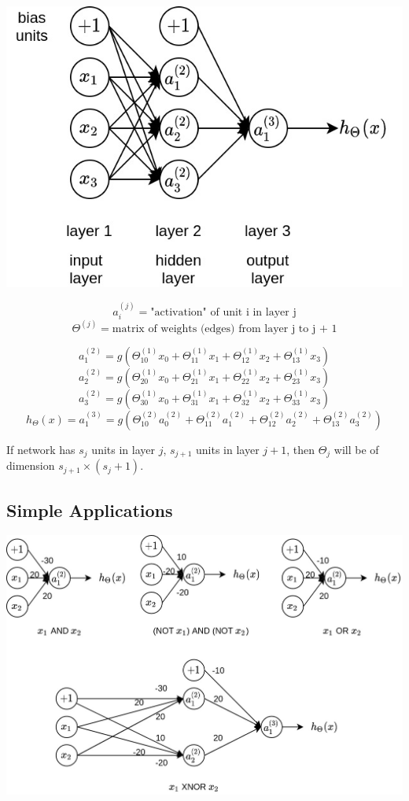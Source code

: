 \documentclass{article}
\begin{document}
\begin{center}
\includegraphics[scale=0.4]{./images/neural_network.jpg}
\end{center}
\[a_i^{(j)} = \text{"activation" of unit i in layer j}\]
\[\Theta^{(j)} = \text{matrix of weights (edges) from layer j to j + 1}\]

\bigskip

\[a_1^{(2)} = g(\Theta_{10}^{(1)} x_0 + \Theta_{11}^{(1)} x_1 + \Theta_{12}^{(1)} x_2 + \Theta_{13}^{(1)} x_3)\]
\[a_2^{(2)} = g(\Theta_{20}^{(1)} x_0 + \Theta_{21}^{(1)} x_1 + \Theta_{22}^{(1)} x_2 + \Theta_{23}^{(1)} x_3)\]
\[a_3^{(2)} = g(\Theta_{30}^{(1)} x_0 + \Theta_{31}^{(1)} x_1 + \Theta_{32}^{(1)} x_2 + \Theta_{33}^{(1)} x_3)\]
\[h_{\Theta}(x) = a_1^{(3)} = g(\Theta_{10}^{(2)} a_0^{(2)} + \Theta_{11}^{(2)} a_1^{(2)} + \Theta_{12}^{(2)} a_2^{(2)} + \Theta_{13}^{(2)} a_3^{(2)})\]

\bigskip

\noindent If network has \(s_j\) units in layer \(j\), \(s_{j + 1}\) units in layer \(j + 1\), then \(\Theta_j\) will be of dimension \(s_{j + 1} \times (s_j + 1)\).

\subsection{Simple Applications}

\begin{center}
\includegraphics[scale=0.3]{./images/neural_network_simple_applications.jpg}
\end{center}
\end{document}
